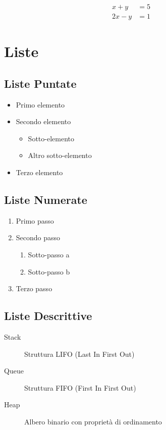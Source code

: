 \documentclass{csnotes}
\begin{document}
\begin{align}
    x + y &= 5 \\
    2x - y &= 1
\end{align}


\section{Liste}

\subsection{Liste Puntate}

\begin{itemize}
    \item Primo elemento
    \item Secondo elemento
    \begin{itemize}
        \item Sotto-elemento
        \item Altro sotto-elemento
    \end{itemize}
    \item Terzo elemento
\end{itemize}

\subsection{Liste Numerate}

\begin{enumerate}
    \item Primo passo
    \item Secondo passo
    \begin{enumerate}
        \item Sotto-passo a
        \item Sotto-passo b
    \end{enumerate}
    \item Terzo passo
\end{enumerate}

\subsection{Liste Descrittive}

\begin{description}
    \item[Stack] Struttura LIFO (Last In First Out)
    \item[Queue] Struttura FIFO (First In First Out)
    \item[Heap] Albero binario con proprietà di ordinamento
\end{description}
\end{document}
